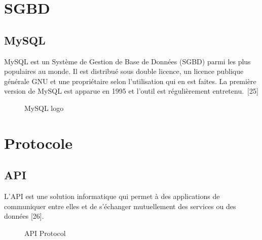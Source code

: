 \section{SGBD}
\subsection{MySQL}
MySQL est un Système de Gestion de Base de Données (SGBD) parmi les plus populaires au monde. Il est distribué sous double licence, un licence publique générale GNU et une propriétaire selon l’utilisation qui en est faites. La première version de MySQL est apparue en 1995 et l’outil est régulièrement entretenu. [25]
\begin{figure}[hbt]
\centering
\right
\label{fig: MySQL LOGO}

  \caption{MySQL logo}
\end{figure}

\section{Protocole}
\subsection{API}
L'API est une solution informatique qui permet à des applications de communiquer entre elles et de s'échanger mutuellement des services ou des données [26].

\begin{figure}[hbt]
\centering
\right
\label{fig: API Protocol}

  \caption{API Protocol}
\end{figure}

